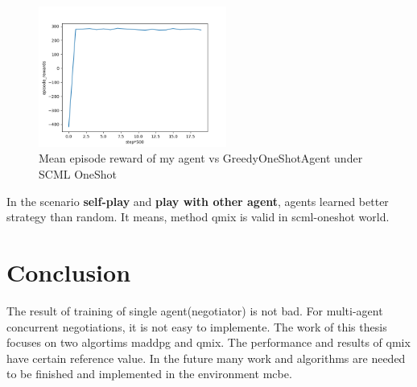 \begin{figure}[htbp]
\centering
\includegraphics[width=0.55\textwidth]{./images/oneshot_my_vs_greedy.png}
\caption{Mean episode reward of my agent vs GreedyOneShotAgent under SCML OneShot}
\label{fig:oneshot-my-vs-greedy}
\end{figure}

In the scenario \textbf{self-play} and \textbf{play with other agent}, agents learned better strategy than random. It means, method \gls{qmix} is valid in scml-oneshot world.

\section{Conclusion}
The result of training of single agent(negotiator) is not bad. For multi-agent concurrent negotiations, it is not easy to implemente. The work of this thesis focuses on two algortims \gls{maddpg} and \gls{qmix}. The performance and results of \gls{qmix} have certain reference value. In the future many work and algorithms are needed to be finished and implemented in the environment \gls{mcbe}.
